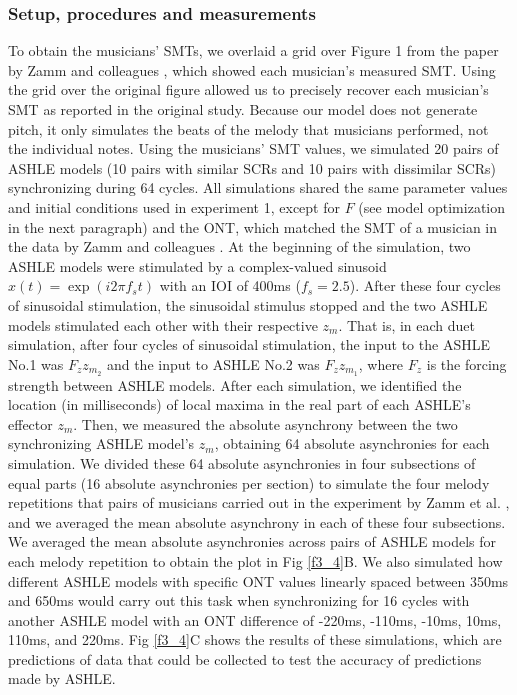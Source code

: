 \documentclass{report}
\begin{document}
\subsubsection{Setup, procedures and measurements}

To obtain the musicians' SMTs, we overlaid a grid over Figure 1 from the paper by Zamm and colleagues \cite{zamm2016endogenous}, which showed each musician's measured SMT. Using the grid over the original figure allowed us to precisely recover each musician's SMT as reported in the original study. Because our model does not generate pitch, it only simulates the beats of the melody that musicians performed, not the individual notes. Using the musicians' SMT values, we simulated 20 pairs of ASHLE models (10 pairs with similar SCRs and 10 pairs with dissimilar SCRs) synchronizing during 64 cycles. All simulations shared the same parameter values and initial conditions used in experiment 1, except for $F$ (see model optimization in the next paragraph) and the ONT, which matched the SMT of a musician in the data by Zamm and colleagues \cite{zamm2016endogenous}. At the beginning of the simulation, two ASHLE models were stimulated by a complex-valued sinusoid $x(t)=\exp(i2\pi	f_s t)$ with an IOI of 400ms ($f_s = 2.5$). After these four cycles of sinusoidal stimulation, the sinusoidal stimulus stopped and the two ASHLE models stimulated each other with their respective $z_m$. That is, in each duet simulation, after four cycles of sinusoidal stimulation, the input to the ASHLE No.1 was $F_z z_{m_2}$ and the input to ASHLE No.2 was $F_z z_{m_1}$, where $F_z$ is the forcing strength between ASHLE models. After each simulation, we identified the location (in milliseconds) of local maxima in the real part of each ASHLE's effector $z_m$. Then, we measured the absolute asynchrony between the two synchronizing ASHLE model's $z_m$, obtaining 64 absolute asynchronies for each simulation. We divided these 64 absolute asynchronies in four subsections of equal parts (16 absolute asynchronies per section) to simulate the four melody repetitions that pairs of musicians carried out in the experiment by Zamm et al. \cite{zamm2016endogenous}, and we averaged the mean absolute asynchrony in each of these four subsections. We averaged the mean absolute asynchronies across pairs of ASHLE models for each melody repetition to obtain the plot in Fig \ref{f3_4}B. We also simulated how different ASHLE models with specific ONT values linearly spaced between 350ms and 650ms would carry out this task when synchronizing for 16 cycles with another ASHLE model with an ONT difference of -220ms, -110ms, -10ms, 10ms, 110ms, and 220ms. Fig \ref{f3_4}C shows the results of these simulations, which are predictions of data that could be collected to test the accuracy of predictions made by ASHLE.
\end{document}
